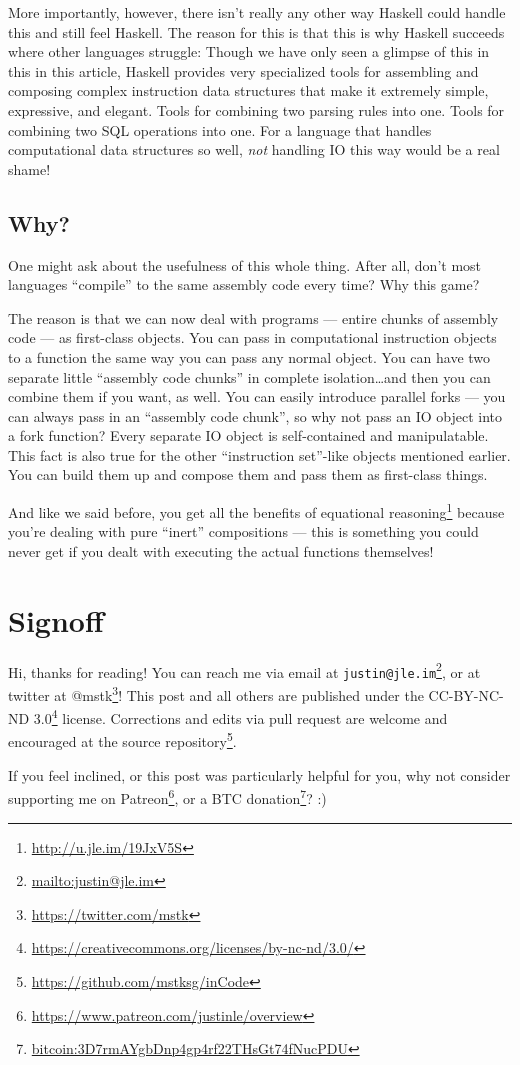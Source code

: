 \documentclass[]{article}
\renewcommand{\href}[2]{#2\footnote{\url{#1}}}
\begin{document}
More importantly, however, there isn't really any other way Haskell could handle
this and still feel Haskell. The reason for this is that this is why Haskell
succeeds where other languages struggle: Though we have only seen a glimpse of
this in this in this article, Haskell provides very specialized tools for
assembling and composing complex instruction data structures that make it
extremely simple, expressive, and elegant. Tools for combining two parsing rules
into one. Tools for combining two SQL operations into one. For a language that
handles computational data structures so well, \emph{not} handling IO this way
would be a real shame!

\subsection{Why?}\label{why}

One might ask about the usefulness of this whole thing. After all, don't most
languages ``compile'' to the same assembly code every time? Why this game?

The reason is that we can now deal with programs --- entire chunks of assembly
code --- as first-class objects. You can pass in computational instruction
objects to a function the same way you can pass any normal object. You can have
two separate little ``assembly code chunks'' in complete isolation\ldots and
then you can combine them if you want, as well. You can easily introduce
parallel forks --- you can always pass in an ``assembly code chunk'', so why not
pass an IO object into a fork function? Every separate IO object is
self-contained and manipulatable. This fact is also true for the other
``instruction set''-like objects mentioned earlier. You can build them up and
compose them and pass them as first-class things.

And like we said before, you get all the benefits of
\href{http://u.jle.im/19JxV5S}{equational reasoning} because you're dealing with
pure ``inert'' compositions --- this is something you could never get if you
dealt with executing the actual functions themselves!

\section{Signoff}\label{signoff}

Hi, thanks for reading! You can reach me via email at
\href{mailto:justin@jle.im}{\nolinkurl{justin@jle.im}}, or at twitter at
\href{https://twitter.com/mstk}{@mstk}! This post and all others are published
under the \href{https://creativecommons.org/licenses/by-nc-nd/3.0/}{CC-BY-NC-ND
3.0} license. Corrections and edits via pull request are welcome and encouraged
at \href{https://github.com/mstksg/inCode}{the source repository}.

If you feel inclined, or this post was particularly helpful for you, why not
consider \href{https://www.patreon.com/justinle/overview}{supporting me on
Patreon}, or a \href{bitcoin:3D7rmAYgbDnp4gp4rf22THsGt74fNucPDU}{BTC donation}?
:)
\end{document}
